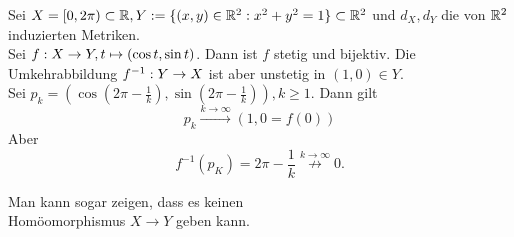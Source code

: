 \documentclass[../ana2u.tex]{subfiles}
\begin{document}
\begin{bsp}
    Sei \(X = [0, 2\pi) \subset \mathbb{R}, 
        Y := \{(x,y) \in \mathbb{R}^2: x^2 + y^2 = 1\} \subset \mathbb{R}^2 \)
        und \( d_X, d_Y \) die von \( \mathbb{R}^2 \) induzierten 
        Metriken.\\ 
        Sei \( f:X\rightarrow Y, t \mapsto (\cos t, \sin t) \).
        Dann ist \(f\) stetig und bijektiv. Die Umkehrabbildung
        \( f^{-1}:Y\rightarrow X \) ist aber unstetig in \((1,0) \in Y\). \\
        Sei \( p_k = \left( \cos \left( 2\pi - \frac{1}{k} \right), 
        \sin\left(2\pi - \frac{1}{k}\right) \right), k \geq 1 \).
        Dann gilt
        \[ p_k \overset{k\rightarrow \infty}{\rightarrow} (1, 0 = f(0)) \]
        Aber 
        \[ f^{-1}(p_K) = 2\pi - \frac{1}{k} 
        \overset{k\rightarrow \infty}{\not \rightarrow} 0. \]
\end{bsp}
\begin{bem}
    Man kann sogar zeigen, dass es keinen\\
    Homöomorphismus \(X \rightarrow Y\) geben kann.
\end{bem}
\end{document}
